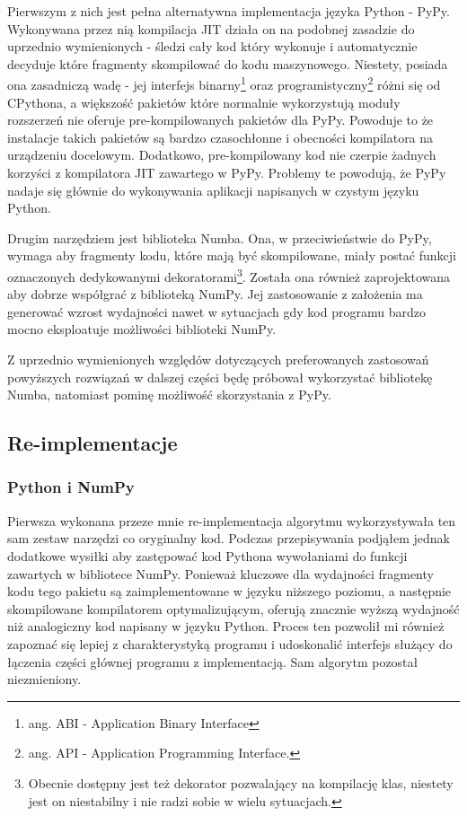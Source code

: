 \documentclass[10pt, a4paper]{article}
\begin{document}
\begin{sloppypar}
    Pierwszym z nich jest pełna alternatywna implementacja języka Python - PyPy\cite{PyPy_Home_Page}.
    Wykonywana przez nią kompilacja JIT działa on na podobnej zasadzie do uprzednio wymienionych
    - śledzi cały kod który wykonuje i automatycznie decyduje które fragmenty skompilować
    do kodu maszynowego\cite{PyPy_JIT}. Niestety, posiada ona zasadniczą wadę - jej
    interfejs binarny\footnote{ang. ABI - Application Binary Interface} oraz programistyczny\footnote{ang.
    API - Application Programming Interface.} różni się od CPythona, a większość
    pakietów które normalnie wykorzystują moduły rozszerzeń nie oferuje pre-kompilowanych
    pakietów dla PyPy. Powoduje to że instalacje takich pakietów są bardzo czasochłonne i
    obecności kompilatora na urządzeniu docelowym. Dodatkowo, pre-kompilowany kod nie czerpie
    żadnych korzyści z kompilatora JIT zawartego w PyPy. Problemy te powodują, że PyPy nadaje
    się głównie do wykonywania aplikacji napisanych w czystym języku Python.

    Drugim narzędziem jest biblioteka Numba\cite{Numba_Article}\cite{Numba_Doc}. Ona, w przeciwieństwie
    do PyPy, wymaga aby fragmenty kodu, które mają być skompilowane, miały postać
    funkcji oznaczonych dedykowanymi dekoratorami\footnote{Obecnie dostępny jest też dekorator
    pozwalający na kompilację klas, niestety jest on niestabilny i nie radzi sobie w
    wielu sytuacjach.}. Została ona również zaprojektowana aby dobrze współgrać z biblioteką
    NumPy. Jej zastosowanie z założenia ma generować wzrost wydajności nawet w
    sytuacjach gdy kod programu bardzo mocno eksploatuje możliwości biblioteki NumPy.

    Z uprzednio wymienionych względów dotyczących preferowanych zastosowań powyższych
    rozwiązań w dalszej części będę próbował wykorzystać bibliotekę Numba, natomiast pominę
    możliwość skorzystania z PyPy.

    \newpage


    \subsection{Re-implementacje}


    \subsubsection{ Python i NumPy }


    Pierwsza wykonana przeze mnie re-implementacja algorytmu wykorzystywała ten sam zestaw
    narzędzi co oryginalny kod. Podczas przepisywania podjąłem jednak dodatkowe wysiłki
    aby zastępować kod Pythona wywołaniami do funkcji zawartych w bibliotece NumPy. Ponieważ
    kluczowe dla wydajności fragmenty kodu tego pakietu są zaimplementowane w języku niższego
    poziomu, a następnie skompilowane kompilatorem optymalizującym, oferują znacznie wyższą
    wydajność niż analogiczny kod napisany w języku Python. Proces ten pozwolił mi
    również zapoznać się lepiej z charakterystyką programu i udoskonalić interfejs
    służący do łączenia części głównej programu z implementacją. Sam algorytm pozostał niezmieniony.


\end{sloppypar}
\end{document}
